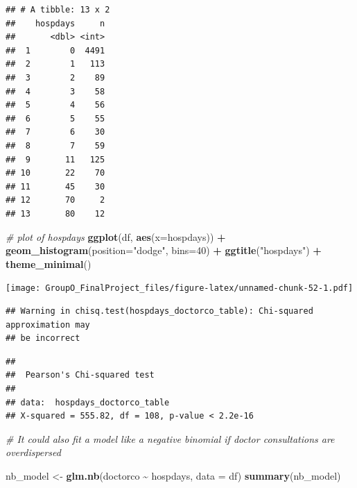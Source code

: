 \documentclass[
]{article}
\newenvironment{Shaded}{\begin{snugshade}}{\end{snugshade}}
\newcommand{\AttributeTok}[1]{\textcolor[rgb]{0.13,0.29,0.53}{#1}}
\newcommand{\CommentTok}[1]{\textcolor[rgb]{0.56,0.35,0.01}{\textit{#1}}}
\newcommand{\DecValTok}[1]{\textcolor[rgb]{0.00,0.00,0.81}{#1}}
\newcommand{\FunctionTok}[1]{\textcolor[rgb]{0.13,0.29,0.53}{\textbf{#1}}}
\newcommand{\NormalTok}[1]{#1}
\newcommand{\OtherTok}[1]{\textcolor[rgb]{0.56,0.35,0.01}{#1}}
\newcommand{\SpecialCharTok}[1]{\textcolor[rgb]{0.81,0.36,0.00}{\textbf{#1}}}
\newcommand{\StringTok}[1]{\textcolor[rgb]{0.31,0.60,0.02}{#1}}
\begin{document}
\begin{verbatim}
## # A tibble: 13 x 2
##    hospdays     n
##       <dbl> <int>
##  1        0  4491
##  2        1   113
##  3        2    89
##  4        3    58
##  5        4    56
##  6        5    55
##  7        6    30
##  8        7    59
##  9       11   125
## 10       22    70
## 11       45    30
## 12       70     2
## 13       80    12
\end{verbatim}

\begin{Shaded}
\begin{Highlighting}[]
\CommentTok{\# plot of hospdays}
\FunctionTok{ggplot}\NormalTok{(df, }\FunctionTok{aes}\NormalTok{(}\AttributeTok{x=}\NormalTok{hospdays)) }\SpecialCharTok{+}
  \FunctionTok{geom\_histogram}\NormalTok{(}\AttributeTok{position=}\StringTok{"dodge"}\NormalTok{, }\AttributeTok{bins=}\DecValTok{40}\NormalTok{) }\SpecialCharTok{+}
  \FunctionTok{ggtitle}\NormalTok{(}\StringTok{"hospdays"}\NormalTok{) }\SpecialCharTok{+}
  \FunctionTok{theme\_minimal}\NormalTok{()}
\end{Highlighting}
\end{Shaded}

\texttt{[image: GroupO\_FinalProject\_files/figure-latex/unnamed-chunk-52-1.pdf]}

\begin{Shaded}
\end{Shaded}

\begin{verbatim}
## Warning in chisq.test(hospdays_doctorco_table): Chi-squared approximation may
## be incorrect
\end{verbatim}

\begin{verbatim}
## 
##  Pearson's Chi-squared test
## 
## data:  hospdays_doctorco_table
## X-squared = 555.82, df = 108, p-value < 2.2e-16
\end{verbatim}

\begin{Shaded}
\begin{Highlighting}[]
\CommentTok{\# It could also fit a model like a negative binomial if doctor consultations are overdispersed}

\NormalTok{nb\_model }\OtherTok{\textless{}{-}} \FunctionTok{glm.nb}\NormalTok{(doctorco }\SpecialCharTok{\textasciitilde{}}\NormalTok{ hospdays, }\AttributeTok{data =}\NormalTok{ df)}
\FunctionTok{summary}\NormalTok{(nb\_model)}
\end{Highlighting}
\end{Shaded}
\end{document}

